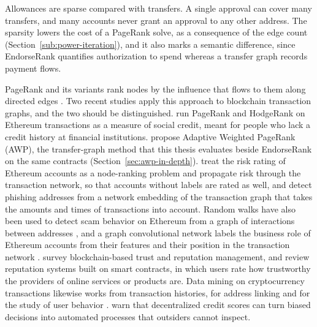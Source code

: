 Allowances are sparse compared with transfers. A single approval can cover many transfers, and many accounts never grant an approval to any other address. The sparsity lowers the cost of a PageRank solve, as a consequence of the edge count (Section~\ref{sub:power-iteration}), and it also marks a semantic difference, since EndorseRank quantifies authorization to spend whereas a transfer graph records payment flows.


PageRank and its variants rank nodes by the influence that flows to them along directed edges \parencite{page1999pagerank}. Two recent studies apply this approach to blockchain transaction graphs, and the two should be distinguished. \textcite{do2023hodgerank} run PageRank and HodgeRank on Ethereum transactions as a measure of social credit, meant for people who lack a credit history at financial institutions. \textcite{do2023awp} propose Adaptive Weighted PageRank (AWP), the transfer-graph method that this thesis evaluates beside EndorseRank on the same contracts (Section~\ref{sec:awp-in-depth}). \textcite{lin2025riskprop} treat the risk rating of Ethereum accounts as a node-ranking problem and propagate risk through the transaction network, so that accounts without labels are rated as well, and \textcite{wu2022phishers} detect phishing addresses from a network embedding of the transaction graph that takes the amounts and times of transactions into account. Random walks have also been used to detect scam behavior on Ethereum from a graph of interactions between addresses \parencite{yan2023aparecium}, and a graph convolutional network labels the business role of Ethereum accounts from their features and their position in the transaction network \parencite{lin2024whoiswho}. \textcite{bellini2020trust} survey blockchain-based trust and reputation management, and \textcite{almasoud2020reputation} review reputation systems built on smart contracts, in which users rate how trustworthy the providers of online services or products are. Data mining on cryptocurrency transactions likewise works from transaction histories, for address linking and for the study of user behavior \parencite{liu2021knowledge}. \textcite{packin2024credit} warn that decentralized credit scores can turn biased decisions into automated processes that outsiders cannot inspect.

